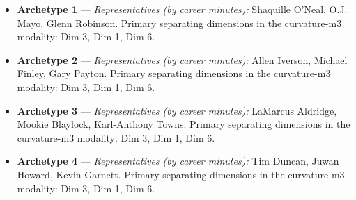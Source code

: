 \begin{itemize}
\item \textbf{Archetype 1} --- \emph{Representatives (by career minutes):} Shaquille O'Neal, O.J. Mayo, Glenn Robinson. Primary separating dimensions in the curvature-m3 modality: Dim 3, Dim 1, Dim 6.
\item \textbf{Archetype 2} --- \emph{Representatives (by career minutes):} Allen Iverson, Michael Finley, Gary Payton. Primary separating dimensions in the curvature-m3 modality: Dim 3, Dim 1, Dim 6.
\item \textbf{Archetype 3} --- \emph{Representatives (by career minutes):} LaMarcus Aldridge, Mookie Blaylock, Karl-Anthony Towns. Primary separating dimensions in the curvature-m3 modality: Dim 3, Dim 1, Dim 6.
\item \textbf{Archetype 4} --- \emph{Representatives (by career minutes):} Tim Duncan, Juwan Howard, Kevin Garnett. Primary separating dimensions in the curvature-m3 modality: Dim 3, Dim 1, Dim 6.
\end{itemize}
